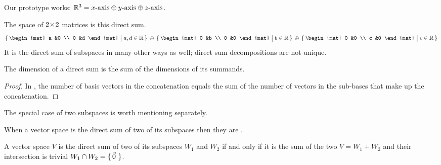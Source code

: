 \begin{example}
Our prototype works: 
$\mathbb{R}^3=\text{$x$-axis}\oplus\text{$y$-axis}\oplus\text{$z$-axis}$. 
\end{example}

\begin{example}
The space of \( 2 \! \times \! 2 \) matrices is this direct sum.
\begin{equation*}
  \set{\begin{mat}
         a  &0  \\
         0  &d
       \end{mat}  \suchthat a,d\in\Re }
  \,\mbox{}\directsum\mbox{}\,
  \set{\begin{mat}
         0  &b  \\
         0  &0
       \end{mat}  \suchthat b\in\Re }
  \,\mbox{}\directsum\mbox{}\,
  \set{\begin{mat}
         0  &0  \\
         c  &0
       \end{mat}  \suchthat c\in\Re }
\end{equation*}
It is the direct sum of subspaces in many other ways as well; 
direct sum decompositions are not unique.
\end{example}

\begin{corollary} \label{cor:DirSumDimsAdd}
The dimension of a direct sum is the sum of the dimensions of its summands.
\end{corollary}

\begin{proof}
In ,
the number of basis vectors in the concatenation equals the sum of
the number of vectors in the sub-bases that make up the concatenation.
\end{proof}

The special case of two subspaces is worth mentioning separately.

\begin{definition}
When a vector space is the direct sum of two of its subspaces then they are
.%
\end{definition}

\begin{lemma}
\label{le:DirectSumTwoSp}
A vector space \( V \) is the 
direct sum
of two of its subspaces \( W_1 \) and \( W_2 \) if and only if it is the
sum of the two \( V=W_1+W_2 \) and their intersection is trivial
\( W_1\cap W_2=\mbox{$\{\,\vec{0}\,\,\}$} \).
\end{lemma}

